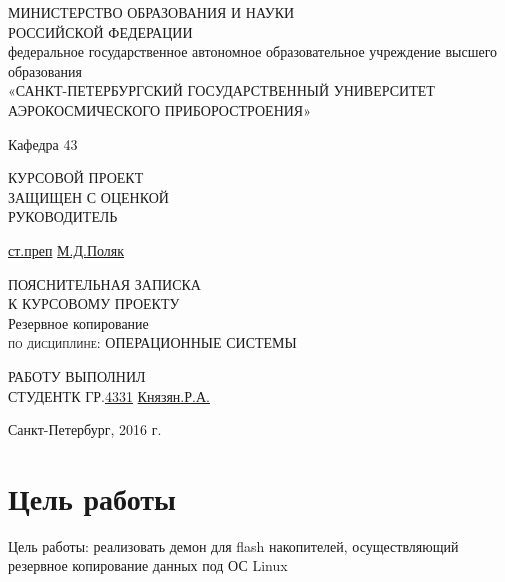 \documentclass[12pt,a4paper]{scrartcl}
\begin{document}
\begin{titlepage}
  \begin{center}
    \large
    МИНИСТЕРСТВО ОБРАЗОВАНИЯ И НАУКИ \\РОССИЙСКОЙ ФЕДЕРАЦИИ\\
    федеральное государственное автономное образовательное учреждение высшего образования\\
    «САНКТ-ПЕТЕРБУРГСКИЙ ГОСУДАРСТВЕННЫЙ УНИВЕРСИТЕТ 
    АЭРОКОСМИЧЕСКОГО ПРИБОРОСТРОЕНИЯ»

    Кафедра 43   
    \end{center}
	\vfill
	\noindent КУРСОВОЙ ПРОЕКТ
    \normalsize{}\\
    \normalsize{ЗАЩИЩЕН С ОЦЕНКОЙ}\\
    \normalsize{РУКОВОДИТЕЛЬ}
    
    \underline{ст.преп}
    \hspace{5cm}
    \underline{\hspace{4cm}}
    \hspace{4cm}
    \underline{М.Д.Поляк}
    \vfill
    
	\begin{center}
	\normalsize{ПОЯСНИТЕЛЬНАЯ ЗАПИСКА}\\
	\normalsize{К КУРСОВОМУ ПРОЕКТУ}\\
	\vfill
	\normalsize{Резервное копирование}\\
	\vfill
    \textsc{по дисциплине: ОПЕРАЦИОННЫЕ СИСТЕМЫ}\\
	\end{center}

	\vfill
	\noindent РАБОТУ ВЫПОЛНИЛ
	\normalsize{}\\  
	\normalsize{СТУДЕНТК ГР.}\hspace{1cm}\underline{4331}
	\hspace{2cm}
	\underline{\hspace{3cm}}
	\hspace{3cm}
	\underline{Князян.Р.А.}
\vfill

\begin{center}
  Санкт-Петербург, 2016 г.
\end{center}
\end{titlepage}
\newpage
\tableofcontents %
\newpage
\section{Цель работы}
	\normalsize{Цель работы: реализовать демон для flash накопителей, осуществляющий резервное копирование данных под ОС Linux}
\end{document}
